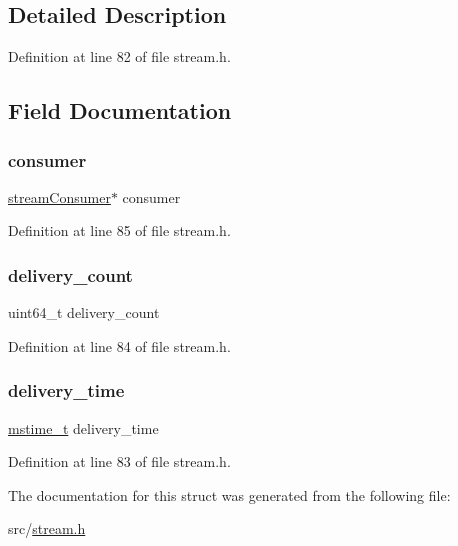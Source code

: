 \subsection{Detailed Description}


Definition at line 82 of file stream.\+h.



\subsection{Field Documentation}
\mbox{\label{structstream_n_a_c_k_a1e3d14baba703bfa5373c96013e3a9b4}} 
\subsubsection{\texorpdfstring{consumer}{consumer}}
{\footnotesize\ttfamily \hyperlink{structstream_consumer}{stream\+Consumer}$\ast$ consumer}



Definition at line 85 of file stream.\+h.

\mbox{\label{structstream_n_a_c_k_a2e86aa619e8c88bc0005fb19d644747e}} 
\subsubsection{\texorpdfstring{delivery\+\_\+count}{delivery\_count}}
{\footnotesize\ttfamily uint64\+\_\+t delivery\+\_\+count}



Definition at line 84 of file stream.\+h.

\mbox{\label{structstream_n_a_c_k_a6586ab12c1a0abb25d054f734432219c}} 
\subsubsection{\texorpdfstring{delivery\+\_\+time}{delivery\_time}}
{\footnotesize\ttfamily \hyperlink{redismodule_8h_a652ae61e2475bc8957454534544968fc}{mstime\+\_\+t} delivery\+\_\+time}



Definition at line 83 of file stream.\+h.



The documentation for this struct was generated from the following file\+:\begin{DoxyCompactItemize}
\item 
src/\hyperlink{stream_8h}{stream.\+h}\end{DoxyCompactItemize}
